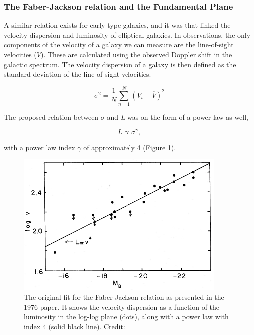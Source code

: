 \subsubsection{The Faber-Jackson relation and the Fundamental Plane}
A similar relation exists for early type galaxies, and it was \textcite{FaberJackson1976} that linked the velocity dispersion and luminosity of elliptical galaxies. In observations, the only components of the velocity of a galaxy we can measure are the line-of-sight velocities ($V$). These are calculated using the observed Doppler shift in the galactic spectrum. The velocity dispersion of a galaxy is then defined as the standard deviation of the line-of sight velocities.

\begin{equation} \label{standard_dev}
    \sigma^{2} = \frac{1}{N} \sum_{n=1}^{N} (V_{i} - \overline{V})^2
\end{equation}

The proposed relation between $\sigma$ and $L$ was on the form of a power law as well,

\begin{equation}
    L \propto \sigma^{\gamma},
\end{equation}

with a power law index $\gamma$ of approximately 4 (Figure \ref{faber_jackson}).

\begin{figure}
    \centering
    \includegraphics[width=0.9\textwidth]{images/faber_jackson.png}
    \caption{The original fit for the Faber-Jackson relation as presented in the 1976 paper. It shows the velocity dispersion as a function of the luminosity in the log-log plane (dots), along with a power law with index 4 (solid black line). Credit: \parencite{FaberJackson1976}}
    \label{faber_jackson}
\end{figure}

